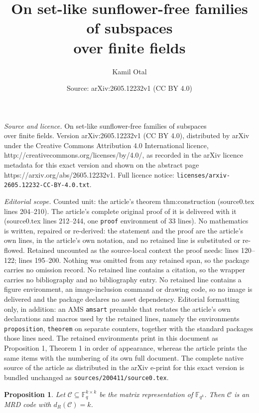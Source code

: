 \documentclass[10pt,a4paper]{amsart}
\title{On set-like sunflower-free families of subspaces\\over finite fields}
\author{Kamil Otal}
\date{Source: arXiv:2605.12232v1 (CC BY 4.0)}
\newtheorem{proposition}{Proposition}
\newcommand{\F}{\mathbb{F}}
\begin{document}
\maketitle

\noindent\emph{Source and licence.} On set-like sunflower-free families of subspaces\\over finite fields. Version arXiv:2605.12232v1 (CC BY 4.0), distributed by arXiv under the Creative Commons Attribution 4.0 International licence, http://creativecommons.org/licenses/by/4.0/, as recorded in the arXiv licence metadata for this exact version and shown on the abstract page https://arxiv.org/abs/2605.12232v1. Full licence notice: \texttt{licenses/arxiv-2605.12232-CC-BY-4.0.txt}.\par\smallskip

\noindent\textit{Editorial scope.} Counted unit: the article's theorem thm:construction (source0.tex lines 204--210). The article's complete original proof of it is delivered with it (source0.tex lines 212--244, one \texttt{proof} environment of 33 lines). No mathematics is written, repaired or re-derived: the statement and the proof are the article's own lines, in the article's own notation, and no retained line is substituted or re-flowed.  Retained uncounted as the source-local context the proof needs: lines 120--122; lines 195--200.  Nothing was omitted from any retained span, so the package carries no omission record.  No retained line contains a citation, so the wrapper carries no bibliography and no bibliography entry.  No retained line contains a figure environment, an image-inclusion command or drawing code, so no image is delivered and the package declares no asset dependency.  Editorial formatting only, in addition: an AMS \texttt{amsart} preamble that restates the article's own declarations and macros used by the retained lines, namely the environments \texttt{proposition}, \texttt{theorem} on separate counters, together with the standard packages those lines need.  The retained environments print in this document as Proposition 1, Theorem 1 in order of appearance, whereas the article prints the same items with the numbering of its own full document.  The complete native source of the article as distributed in the arXiv e-print for this exact version is bundled unchanged as \texttt{sources/200411/source0.tex}.
\begin{proposition}\label{prop:matrix-rep}
Let $\mathcal{C} \subseteq \F_q^{k \times k}$ be the matrix representation of $\F_{q^k}$. Then $\mathcal{C}$ is an MRD code with $d_R(\mathcal{C}) = k$.
\end{proposition}
\end{document}
